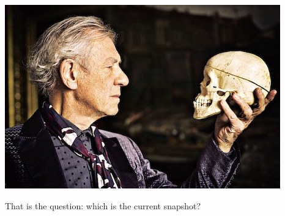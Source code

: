 \documentclass[aspectratio=169]{beamer}
\begin{document}
\begin{frame}
	\noindent\begin{minipage}{0.5\textwidth}
	\includegraphics[width=\linewidth]{pictures/to-be-or-not-to-be-that-is-the-question.jpg}
	\end{minipage}%
	\hfill%
	\begin{minipage}{0.45\textwidth}\raggedleft
	  \begin{block}{That is the  question:}
	  	which is the current snapshot?
	  \end{block}
	
	\end{minipage}
\end{frame}
  
  
\end{document}
